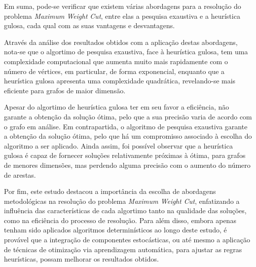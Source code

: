 \documentclass[mirror]{revdetua}
\begin{document}
Em suma, pode-se verificar que existem várias abordagens para a resolução do problema \textit{Maximum Weight Cut}, entre elas a pesquisa exaustiva e a heurística gulosa, cada qual com as suas vantagens e desvantagens.

Através da análise dos resultados obtidos com a aplicação destas abordagens, nota-se que o algortimo de pesquisa exaustiva, face à heurística gulosa, tem uma complexidade computacional que aumenta muito mais rapidamente com o número de vértices, em particular, de forma exponencial, enquanto que a heurística gulosa apresenta uma complexidade quadrática, revelando-se mais eficiente para grafos de maior dimensão.

Apesar do algortimo de heurística gulosa ter em seu favor a eficiência, não garante a obtenção da solução ótima, pelo que a sua precisão varia de acordo com o grafo em análise. Em contrapartida, o algoritmo de pesquisa exaustiva garante a obtenção da solução ótima, pelo que há um compromisso associado à escolha do algoritmo a ser aplicado. Ainda assim, foi possível observar que a heurística gulosa é capaz de fornecer soluções relativamente próximas à ótima, para grafos de menores dimensões, mas perdendo alguma precisão com o aumento do número de arestas.

Por fim, este estudo destacou a importância da escolha de abordagens metodológicas na resolução do problema \textit{Maximum Weight Cut}, enfatizando a influência das características de cada algortimo tanto na qualidade das soluções, como na eficiência do processo de resolução. Para além disso, embora apenas tenham sido aplicados algoritmos determinísticos ao longo deste estudo, é provável que a integração de componentes estocásticas, ou até mesmo a aplicação de técnicas de otimização via aprendizagem automática, para ajustar as regras heurísticas, possam melhorar os resultados obtidos.


\end{document}

